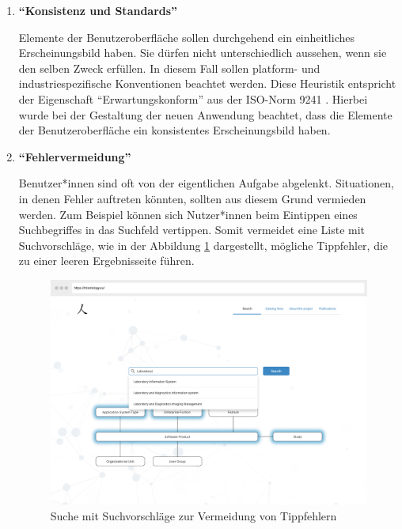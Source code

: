 \begin{enumerate}
\clearpage


\item \textbf{\enquote{Konsistenz und Standards}} \newline

Elemente der Benutzeroberfläche sollen durchgehend ein einheitliches Erscheinungsbild haben.
Sie dürfen nicht unterschiedlich aussehen, wenn sie den selben Zweck erfüllen.
In diesem Fall sollen platform- und industriespezifische Konventionen beachtet werden.
Diese Heuristik entspricht der Eigenschaft \enquote{Erwartungskonform} aus der ISO-Norm 9241 \citep{ISO_standard}.
Hierbei wurde bei der Gestaltung der neuen Anwendung beachtet, dass die Elemente der Benutzeroberfläche ein konsistentes Erscheinungsbild haben.


\item \textbf{\enquote{Fehlervermeidung}} \newline

Benutzer*innen sind oft von der eigentlichen Aufgabe abgelenkt.
Situationen, in denen Fehler auftreten könnten, sollten aus diesem Grund vermieden werden.
Zum Beispiel können sich Nutzer*innen beim Eintippen eines Suchbegriffes in das Suchfeld vertippen.
Somit vermeidet eine Liste mit Suchvorschläge, wie in der Abbildung \ref{fig:point5_danach} dargestellt, mögliche Tippfehler, die zu einer leeren Ergebnisseite führen.

\begin{figure}[H]
	\centering
    	\includegraphics[width=1.45\textwidth, angle=-90]{Images/Mockup_Startseite_3}
   	\caption[Suche mit Suchvorschläge]{Suche mit Suchvorschläge zur Vermeidung von Tippfehlern}
   	\label{fig:point5_danach}
\end{figure}


\end{enumerate}

